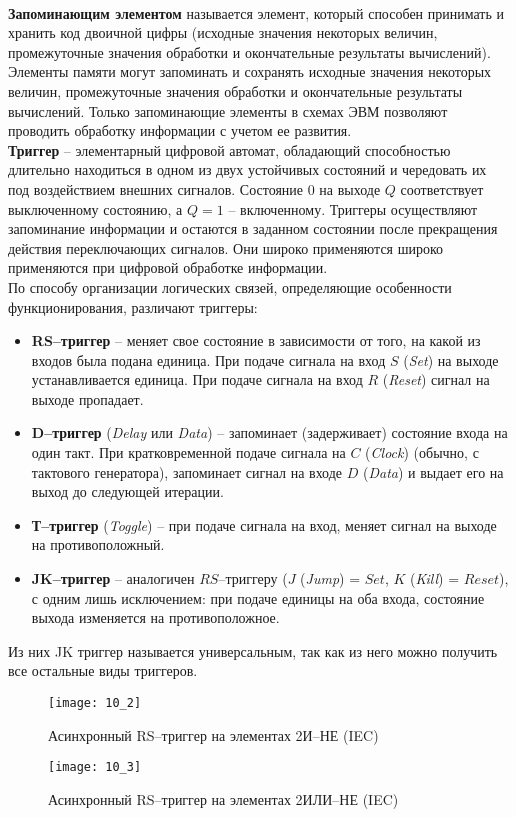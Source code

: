 \\\textbf{Запоминающим элементом} называется элемент, который способен принимать и хранить код двоичной цифры (исходные значения некоторых величин, промежуточные значения обработки и окончательные результаты вычислений). Элементы памяти могут запоминать и сохранять исходные значения некоторых величин, промежуточные значения обработки и окончательные результаты вычислений. Только запоминающие элементы в схемах ЭВМ позволяют проводить обработку информации с учетом ее развития.
\\\textbf{Триггер} -- элементарный цифровой автомат, обладающий способностью длительно находиться в одном из двух устойчивых состояний и чередовать их под воздействием внешних сигналов. Состояние $0$ на выходе $Q$ соответствует выключенному состоянию, а $Q = 1$ -- включенному. Триггеры осуществляют запоминание информации и остаются в заданном состоянии после прекращения действия переключающих сигналов. Они широко применяются широко применяются при цифровой обработке информации.
\\По способу организации логических связей, определяющие особенности функционирования, различают триггеры:
\begin{itemize}
  \item \textbf{RS--триггер} -- меняет свое состояние в зависимости от того, на какой из входов была подана единица. При подаче сигнала на вход $S$ (\emph{Set}) на выходе устанавливается единица. При подаче сигнала на вход $R$ (\emph{Reset}) сигнал на выходе пропадает.
  \item  \textbf{D--триггер} (\emph{Delay} или \emph{Data}) -- запоминает (задерживает) состояние входа на один такт. При кратковременной подаче сигнала на $C$ (\emph{Clock}) (обычно, с тактового генератора), запоминает сигнал на входе $D$ (\emph{Data}) и выдает его на выход до следующей итерации.
  \item \textbf{Т--триггер} (\emph{Toggle}) -- при подаче сигнала на вход, меняет сигнал на выходе на противоположный.
  \item \textbf{JK--триггер} -- аналогичен $RS$--триггеру ($J$ (\emph{Jump}) = $Set$, $K$ (\emph{Kill}) = $Reset$), с одним лишь исключением: при подаче единицы на оба входа, состояние выхода изменяется на противоположное.
\end{itemize}
Из них JK триггер называется универсальным, так как из него можно получить все остальные виды триггеров.
\begin{figure}[!h]
\begin{minipage}{5cm}
\texttt{[image: 10\_2]}
\caption{Асинхронный RS--триггер на элементах 2И--НЕ (IEC)}
\end{minipage}
\hfill
\begin{minipage}{5cm}
\texttt{[image: 10\_3]}
\caption{Асинхронный RS--триггер на элементах 2ИЛИ--НЕ (IEC)}
\label{tag:RS_NOR}
\end{minipage}
\end{figure}

